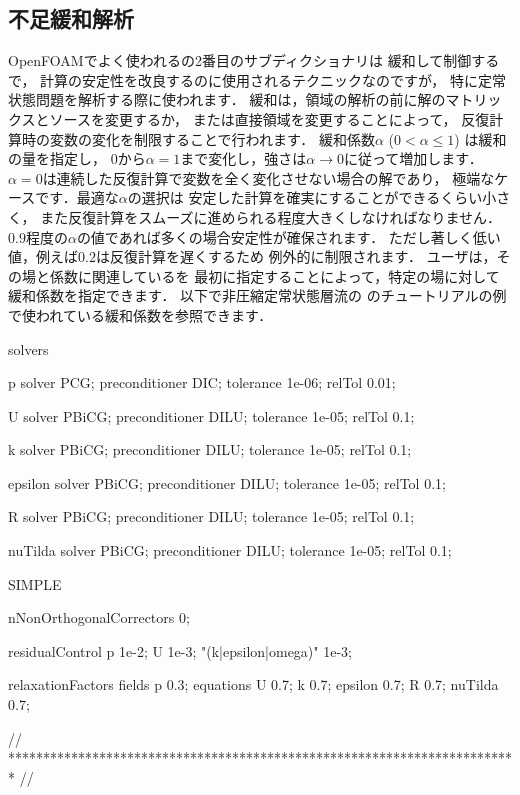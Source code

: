 \subsection{不足緩和解析}
\label{ssec:4.5.2}
OpenFOAMでよく使われるの2番目のサブディクショナリは
緩和して制御するで，
計算の安定性を改良するのに使用されるテクニックなのですが，
特に定常状態問題を解析する際に使われます．
緩和は，領域の解析の前に解のマトリックスとソースを変更するか，
または直接領域を変更することによって，
反復計算時の変数の変化を制限することで行われます．
緩和係数$\alpha$ ($0 < \alpha \le 1$) は緩和の量を指定し，
$0$から$\alpha = 1$まで変化し，強さは$\alpha \to 0$に従って増加します．
$\alpha = 0$は連続した反復計算で変数を全く変化させない場合の解であり，
極端なケースです．最適な$\alpha$の選択は
安定した計算を確実にすることができるくらい小さく，
また反復計算をスムーズに進められる程度大きくしなければなりません．
$0.9$程度の$\alpha$の値であれば多くの場合安定性が確保されます．
ただし著しく低い値，例えば$0.2$は反復計算を遅くするため
例外的に制限されます．
ユーザは，その場と係数に関連しているを
最初に指定することによって，特定の場に対して緩和係数を指定できます．
以下で非圧縮定常状態層流の
のチュートリアルの例で使われている緩和係数を参照できます．
\begin{OFverbatim}[file, linenum=17]

solvers
{
    p
    {
        solver          PCG;
        preconditioner  DIC;
        tolerance       1e-06;
        relTol          0.01;
    }

    U
    {
        solver          PBiCG;
        preconditioner  DILU;
        tolerance       1e-05;
        relTol          0.1;
    }

    k
    {
        solver          PBiCG;
        preconditioner  DILU;
        tolerance       1e-05;
        relTol          0.1;
    }

    epsilon
    {
        solver          PBiCG;
        preconditioner  DILU;
        tolerance       1e-05;
        relTol          0.1;
    }

    R
    {
        solver          PBiCG;
        preconditioner  DILU;
        tolerance       1e-05;
        relTol          0.1;
    }

    nuTilda
    {
        solver          PBiCG;
        preconditioner  DILU;
        tolerance       1e-05;
        relTol          0.1;
    }
}

SIMPLE
{
    nNonOrthogonalCorrectors 0;

    residualControl
    {
        p               1e-2;
        U               1e-3;
        "(k|epsilon|omega)" 1e-3;
    }
}

relaxationFactors
{
    fields
    {
        p               0.3;
    }
    equations
    {
        U               0.7;
        k               0.7;
        epsilon         0.7;
        R               0.7;
        nuTilda         0.7;
    }
}


// ************************************************************************* //
\end{OFverbatim}


